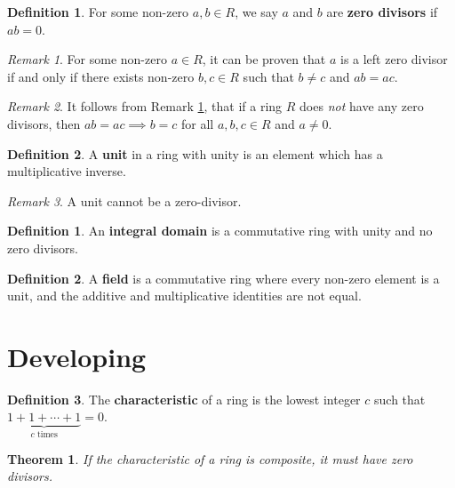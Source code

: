 \documentclass[11pt]{article}
\newtheorem{theorem}{Theorem}[definition]
\theoremstyle{definition}
\newtheorem{definition}{Definition}[section]
\newtheorem{subdefinition}{Definition}[definition]
\theoremstyle{remark}
\newtheorem{remark}{Remark}[definition]
\begin{document}
\begin{subdefinition}
    For some non-zero $a,b\in R$, we say $a$ and $b$ are \textbf{zero divisors}
    if $ab=0$.
\end{subdefinition}

\begin{remark}
    \label{rem:zero divisor}
    For some non-zero $a\in R$, it can be proven that $a$ is a left zero
    divisor if and only if there exists non-zero $b,c\in R$ such that $b\neq c$
    and $ab=ac$.
\end{remark}

\begin{remark}
    It follows from Remark \ref{rem:zero divisor}, that if a ring $R$ does
    \textit{not} have any zero divisors, then $ab=ac\implies b=c$ for all
    $a,b,c\in R$ and $a\neq 0$.
\end{remark}

\begin{subdefinition}
    A \textbf{unit} in a ring with unity is an element which has a
    multiplicative inverse.
\end{subdefinition}

\begin{remark}
    A unit cannot be a zero-divisor.
\end{remark}


\begin{definition}
    An \textbf{integral domain} is a commutative ring with unity and no zero
    divisors.
\end{definition}


\begin{definition}
    A \textbf{field} is a commutative ring where every non-zero element is a
    unit, and the additive and multiplicative identities are not equal.
\end{definition}


\section{Developing}


\begin{definition}
    The \textbf{characteristic} of a ring is the lowest integer $c$ such that
    $\underbrace{1+1+\cdots+1}_{c\text{ times}}=0$.
\end{definition}

\begin{theorem}
    If the characteristic of a ring is composite, it must have zero divisors.
\end{theorem}
\end{document}

